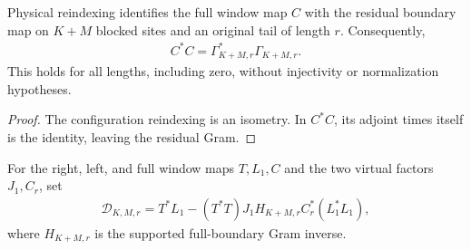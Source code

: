 \begin{lemma}
    \label{thm:residual_full_window_gram}
    \leanok
    Physical reindexing identifies the full window map $C$ with the residual
    boundary map on $K+M$ blocked sites and an original tail of length $r$.
    Consequently,
    \begin{align}
        C^*C=\Gamma_{K+M,r}^*\Gamma_{K+M,r}.
    \end{align}
    This holds for all lengths, including zero, without injectivity or
    normalization hypotheses.

\end{lemma}
\begin{proof}\leanok
    The configuration reindexing is an isometry. In $C^*C$, its adjoint times
    itself is the identity, leaving the residual Gram.
\end{proof}

\begin{definition}
    \label{def:residual_window_mixed_gram_residual}
    \leanok
    For the right, left, and full window maps $T,L_1,C$ and the two virtual
    factors $J_1,C_r$, set
    \begin{align}
        \mathcal D_{K,M,r}
        =T^*L_1-(T^*T)J_1H_{K+M,r}C_r^*(L_1^*L_1),
    \end{align}
    where $H_{K+M,r}$ is the supported full-boundary Gram inverse.
\end{definition}


